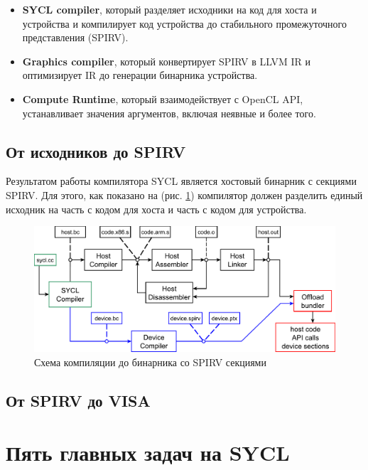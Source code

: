 \documentclass[a4paper,12pt,oneside]{article}
\begin{document}
\begin{itemize}
\item \textbf{SYCL compiler}, который разделяет исходники на код для хоста и устройства и компилирует код устройства до стабильного промежуточного представления (SPIRV).
\item \textbf{Graphics compiler}, который конвертирует SPIRV в LLVM IR и оптимизирует IR до генерации бинарника устройства. 
\item \textbf{Compute Runtime}, который взаимодействует с OpenCL API, устанавливает значения аргументов, включая неявные и более того.
\end{itemize}

\subsection{От исходников до SPIRV}\label{subsec:syclcompiler}

Результатом работы компилятора SYCL является хостовый бинарник с секциями SPIRV. Для этого, как показано на (рис. \ref{fig:syclscheme}) компилятор должен разделить единый исходник на часть с кодом для хоста и часть с кодом для устройства.

\begin{figure}
\centering
\includegraphics[width=1.1\textwidth]{pictures/sycl-scheme.pdf}
\caption{Схема компиляции до бинарника со SPIRV секциями}
\label{fig:syclscheme}
\end{figure}

\subsection{От SPIRV до VISA}\label{subsec:igc}

\pagebreak
\section{Пять главных задач на SYCL}\label{sec:FiveTasks}
\end{document}
